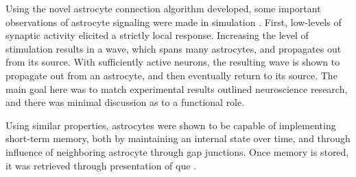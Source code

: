     Using the novel astrocyte connection algorithm developed, some important
    observations of astrocyte signaling were made in simulation
    \parencite{postnov_2009}. First, low-levels of synaptic activity elicited a
    strictly local response. Increasing the level of stimulation results in a
    \ca wave, which spans many astrocytes, and propagates out from its
    source. With sufficiently active neurons, the resulting \ca wave is shown to
    propagate out from an astrocyte, and then eventually return to its
    source. The main goal here was to match experimental results outlined
    neuroscience research, and there was minimal discussion as to a functional
    role.

    Using similar properties, astrocytes were shown to be capable of
    implementing short-term memory, both by maintaining an internal state over
    time, and through influence of neighboring astrocyte through gap
    junctions. Once memory is stored, it was retrieved through presentation of
    que \parencite{gordleeva_2021}.

    
    
    
